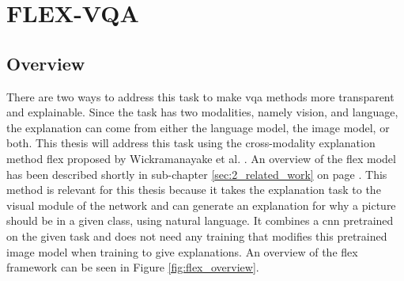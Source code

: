 \label{sec:3_methodology}

    \section{FLEX-VQA}
        \subsection{Overview}

        There are two ways to address this task to make \gls{vqa} methods more transparent and explainable. Since the task has two modalities, namely vision, and language, the explanation can come from either the language model, the image model, or both. This thesis will address this task using the cross-modality explanation method \gls{flex} proposed by Wickramanayake et al. \cite{wickramanayakeFLEXFaithfulLinguistic2019}. An overview of the \gls{flex} model has been described shortly in sub-chapter \ref{sec:2_related_work} on page \pageref{sec:2_related_work}. This method is relevant for this thesis because it takes the explanation task to the visual module of the network and can generate an explanation for why a picture should be in a given class, using natural language. It combines a \gls{cnn} pretrained on the given task and does not need any training that modifies this pretrained image model when training to give explanations. An overview of the \gls{flex} framework can be seen in Figure \ref{fig:flex_overview}.


